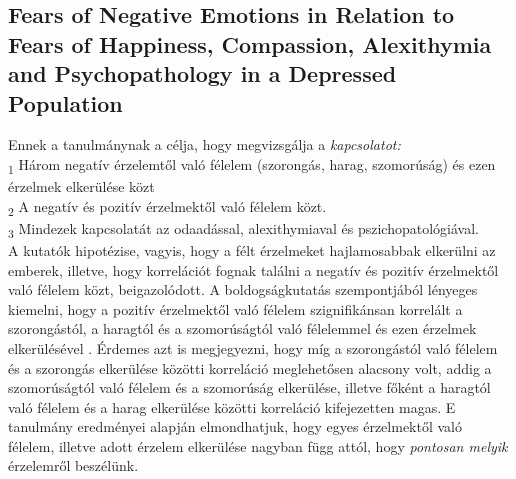 \subsection{Fears of Negative Emotions in Relation to Fears of Happiness, Compassion,
	Alexithymia and Psychopathology in a Depressed Population \cite{gilbert_2014}}
 Ennek a tanulmánynak a célja, hogy megvizsgálja a \textit{kapcsolatot:}\\
 \textsubscript{1} Három negatív érzelemtől való félelem (szorongás, harag, szomorúság) és ezen érzelmek elkerülése közt \\
 \textsubscript{2} A negatív és pozitív érzelmektől való félelem közt.\\
 \textsubscript{3} Mindezek kapcsolatát az odaadással, alexithymiaval és pszichopatológiával.\\
 A kutatók hipotézise, vagyis, hogy a félt érzelmeket hajlamosabbak elkerülni az emberek, illetve, hogy korrelációt fognak találni a negatív és pozitív érzelmektől való félelem közt, beigazolódott. A boldogságkutatás szempontjából lényeges kiemelni, hogy a pozitív érzelmektől való félelem szignifikánsan korrelált a szorongástól, a haragtól és a szomorúságtól való félelemmel és ezen érzelmek elkerülésével \cite{gilbert_2014}. Érdemes azt is megjegyezni, hogy míg a szorongástól való félelem és a szorongás elkerülése közötti korreláció meglehetősen alacsony volt, addig a szomorúságtól való félelem és a szomorúság elkerülése, illetve főként a haragtól való félelem és a harag elkerülése közötti korreláció kifejezetten magas\cite{gilbert_2014}. E tanulmány eredményei alapján elmondhatjuk, hogy egyes érzelmektől való félelem, illetve adott érzelem elkerülése nagyban függ attól, hogy \textit{pontosan melyik} érzelemről beszélünk.

